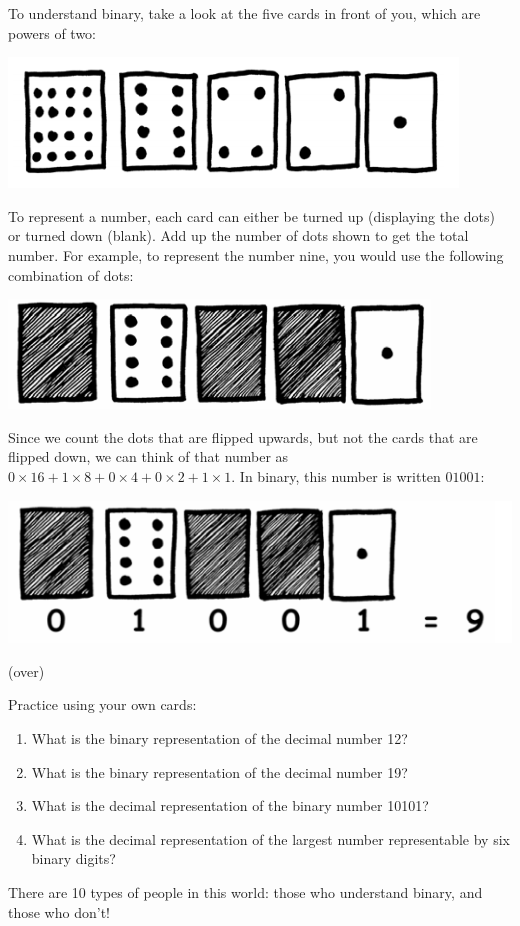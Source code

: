 \documentclass{article}
\begin{document}
To understand binary, take a look at the five cards in front of you, which are
powers of two:

\begin{minipage}{\textwidth}
\centering
\includegraphics[width=.7\textwidth]{dots}
\end{minipage}
To represent a number, each card can either be turned up (displaying the dots)
or turned down (blank). Add up the number of dots shown to get the total number.
For example, to represent the number nine, you would use the following
combination of dots:

\begin{minipage}{\textwidth}
\centering
\includegraphics[width=.7\textwidth]{dots9}
\end{minipage}
Since we count the dots that are flipped upwards, but not the cards that are
flipped down, we can think of that number as
$0\times16 + 1\times8 + 0\times4 + 0\times2 + 1\times1$. In binary, this number
is written $01001$:

\begin{minipage}{\textwidth}
\centering
\includegraphics[width=.7\textwidth]{dots9'}
\end{minipage}
 
\vfill
\begin{center}(over)
\end{center}
\newpage

\noindent
Practice using your own cards:
\begin{enumerate}
    \item What is the binary representation of the decimal number 12? %
    \item What is the binary representation of the decimal number 19? %
    \item What is the decimal representation of the binary number 10101? %
    \item What is the decimal representation of the largest number representable
      by six binary digits? %
\end{enumerate}
There are 10 types of people in this world: those who understand binary, and
those who don't!
\end{document}
